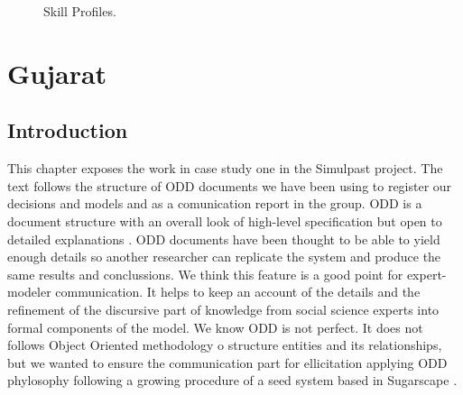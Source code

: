 \documentclass[11pt,oneside,a4paper,openright]{report}
\begin{document}
\begin{figure}[h]
\centering
\setlength\fboxsep{0pt}
\setlength\fboxrule{0.5pt}
\caption{Skill Profiles.}
\label{fig:SkillProfiles}
\end{figure}


\chapter{Gujarat}

\section{Introduction}

This chapter exposes the work in case study one in the Simulpast project. 
The text follows the structure of ODD documents we have been using to register our decisions and models and as a comunication report in the group. ODD is a document structure with an overall look of high-level specification but open to detailed explanations \cite{GrimmBergerODD2012}. ODD documents have been thought to be able to yield enough details so another researcher can replicate the system and produce the same results and conclussions. We think this feature is a good point for expert-modeler communication. It helps to keep an account of the details and the refinement of the discursive part of knowledge from social science experts into formal components of the model. We know ODD is not perfect. It does not follows Object Oriented methodology o structure entities and its relationships, but we wanted to ensure the communication part for ellicitation applying ODD phylosophy following a growing procedure of a seed system based in Sugarscape \cite{EpsteinAxtell}.
\end{document}
